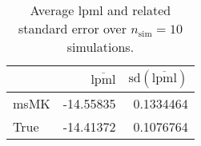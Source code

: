 \begin{table}[H]

\caption{Average lpml and related standard error over $n_{\text{sim}} = 10$ simulations.}
\centering
\begin{tabular}[t]{lrr}
\toprule
  & $\overbar{\text{lpml}}$ & $\text{sd}(\overbar{\text{lpml}})$\\
\midrule
msMK & -14.55835 & 0.1334464\\
True & -14.41372 & 0.1076764\\
\bottomrule
\end{tabular}
\end{table}